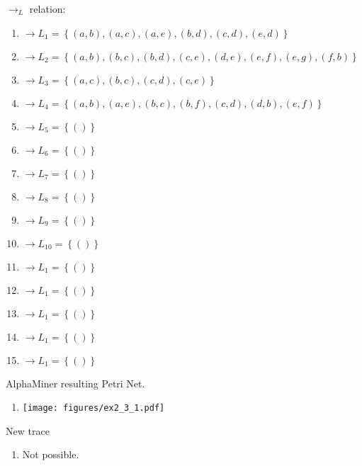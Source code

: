 \documentclass[a4paper]{report}
\begin{document}

$\to _L$ relation:

\begin{enumerate}
    \item $\to L_1=\left\{ (a,b), \left(a,c \right), \left( a,e \right)
	, \left( b,d \right) , \left( c,d \right) , \left( e,d \right) \right\} $
    \item $\to L_2= \left\{ \left( a,b \right),\left( b,c \right) ,\left( b,d \right) , \left(
	c,e\right) ,\left( d,e \right) ,\left( e,f \right) ,\left( e,g \right) ,\left( f,b \right)
    \right\} $
    \item $\to L_3= \left\{ \left( a,c \right),\left( b,c \right) , \left( c,d \right) ,\left(
	c,e\right)    \right\} $
    \item $\to L_4= \left\{ \left( a,b \right),\left( a,e \right) ,\left( b,c \right) ,\left(
	b,f\right) ,\left( c,d \right) ,\left( d,b \right) , \left( e,f \right) \right\} $
    \item $\to L_5= \left\{ \left(  \right)  \right\} $
    \item $\to L_6= \left\{ \left(  \right)  \right\} $
    \item $\to L_7= \left\{ \left(  \right)  \right\} $
    \item $\to L_8= \left\{ \left(  \right)  \right\} $
    \item $\to L_9= \left\{ \left(  \right)  \right\} $
    \item $\to L_{10}= \left\{ \left(  \right)  \right\} $
    \item $\to L_1= \left\{ \left(  \right)  \right\} $
    \item $\to L_1= \left\{ \left(  \right)  \right\} $
    \item $\to L_1= \left\{ \left(  \right)  \right\} $
    \item $\to L_1= \left\{ \left(  \right)  \right\} $
    \item $\to L_1= \left\{ \left(  \right)  \right\} $
\end{enumerate}

AlphaMiner resulting Petri Net.

\begin{enumerate}
    \item \texttt{[image: figures/ex2\_3\_1.pdf]}
\end{enumerate}

New trace

\begin{enumerate}
    \item Not possible.
\end{enumerate}
\end{document}
